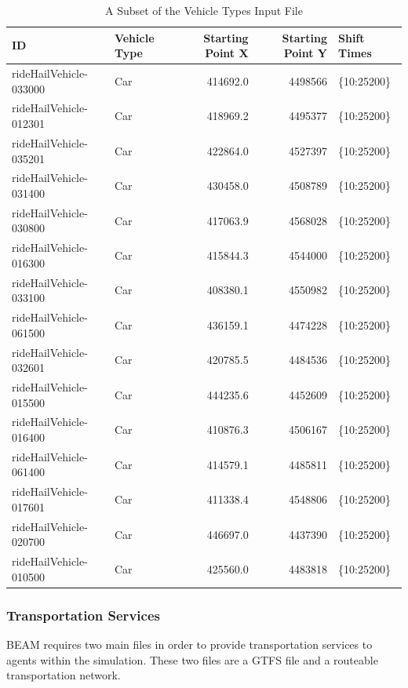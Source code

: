 \documentclass[12pt, oneside, openright]{byuthesis}
\begin{document}
\begin{table}

\caption{\label{tab:rhveh}A Subset of the Vehicle Types Input File}
\centering
\begin{tabular}[t]{llrrl}
\toprule
ID & Vehicle Type & Starting Point X & Starting Point Y & Shift Times\\
\midrule
rideHailVehicle-033000 & Car & 414692.0 & 4498566 & \{10:25200\}\\
rideHailVehicle-012301 & Car & 418969.2 & 4495377 & \{10:25200\}\\
rideHailVehicle-035201 & Car & 422864.0 & 4527397 & \{10:25200\}\\
rideHailVehicle-031400 & Car & 430458.0 & 4508789 & \{10:25200\}\\
rideHailVehicle-030800 & Car & 417063.9 & 4568028 & \{10:25200\}\\
\addlinespace
rideHailVehicle-016300 & Car & 415844.3 & 4544000 & \{10:25200\}\\
rideHailVehicle-033100 & Car & 408380.1 & 4550982 & \{10:25200\}\\
rideHailVehicle-061500 & Car & 436159.1 & 4474228 & \{10:25200\}\\
rideHailVehicle-032601 & Car & 420785.5 & 4484536 & \{10:25200\}\\
rideHailVehicle-015500 & Car & 444235.6 & 4452609 & \{10:25200\}\\
\addlinespace
rideHailVehicle-016400 & Car & 410876.3 & 4506167 & \{10:25200\}\\
rideHailVehicle-061400 & Car & 414579.1 & 4485811 & \{10:25200\}\\
rideHailVehicle-017601 & Car & 411338.4 & 4548806 & \{10:25200\}\\
rideHailVehicle-020700 & Car & 446697.0 & 4437390 & \{10:25200\}\\
rideHailVehicle-010500 & Car & 425560.0 & 4483818 & \{10:25200\}\\
\bottomrule
\end{tabular}
\end{table}

\hypertarget{transportation-services}{%
\subsubsection{Transportation Services}\label{transportation-services}}

BEAM requires two main files in order to provide transportation services to agents within the simulation. These two files are a GTFS file and a routeable transportation network.
\end{document}
